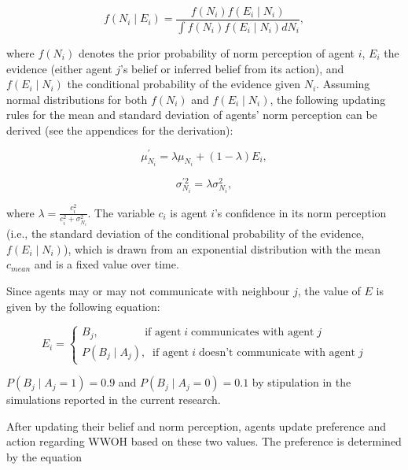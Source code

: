 \documentclass[
  11pt,
]{article}
\begin{document}
\begin{equation}
\label{eq:2}
f(N_i \mid E_i) = \frac{f(N_i) f(E_i \mid N_i)}{\int f(N_i) f(E_i \mid N_i) dN_i},
\end{equation}

where \(f(N_i)\) denotes the prior probability of norm perception of
agent \(i\), \(E_i\) the evidence (either agent \(j\)'s belief or
inferred belief from its action), and \(f(E_i \mid N_i)\) the
conditional probability of the evidence given \(N_i\). Assuming normal
distributions for both \(f(N_i)\) and \(f(E_i \mid N_i)\), the following
updating rules for the mean and standard deviation of agents' norm
perception can be derived (see the appendices for the derivation):

\begin{equation}
\label{eq:3}
\mu_{N_i}^{\prime} = \lambda \mu_{N_i} + (1 - \lambda) E_i,
\end{equation}

\begin{equation}
\label{eq:4}
\sigma_{N_i}^{\prime2} = \lambda \sigma_{N_i}^2,
\end{equation}

where \(\lambda = \frac{c_i^2}{c_i^2 + \sigma_{N_i}^2}\). The variable
\(c_i\) is agent \(i\)'s confidence in its norm perception (i.e., the
standard deviation of the conditional probability of the evidence,
\(f(E_i \mid N_i)\)), which is drawn from an exponential distribution
with the mean \(c_{mean}\) and is a fixed value over time.

Since agents may or may not communicate with neighbour \(j\), the value
of \(E\) is given by the following equation:

\begin{equation}
  E_i = \begin{cases}
    B_j, \;\;\;\;\;\;\;\;\;\;\;\;\;\;\; \text{if agent} \; i \; \text{communicates with agent} \; j \\
    P(B_j \mid A_j), \;\; \text{if agent} \; i \; \text{doesn't communicate with agent} \; j
  \end{cases}
\end{equation}

\(P(B_j \mid A_j = 1) = 0.9\) and \(P(B_j \mid A_j = 0) = 0.1\) by
stipulation in the simulations reported in the current research.

After updating their belief and norm perception, agents update
preference and action regarding WWOH based on these two values. The
preference is determined by the equation
\end{document}
